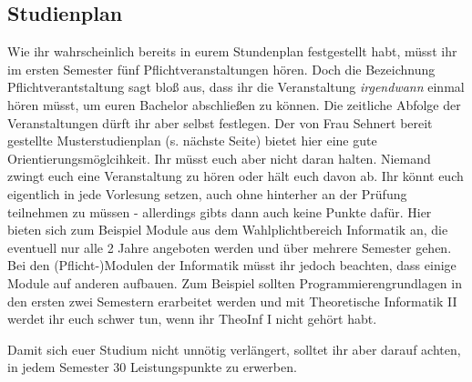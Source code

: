 \begin{multicols}{2}
\subsection{Studienplan}
	\label{bach_studienplan}
	Wie ihr wahrscheinlich bereits in eurem Stundenplan festgestellt habt, müsst ihr im ersten Semester fünf Pflichtveranstaltungen hören. Doch die Bezeichnung Pflichtverantstaltung sagt bloß aus, dass ihr die Veranstaltung \emph{irgendwann} einmal hören müsst, um euren Bachelor abschließen zu können. Die zeitliche Abfolge der Veranstaltungen dürft ihr aber selbst festlegen. Der von Frau Sehnert bereit gestellte Musterstudienplan (s. nächste Seite) bietet hier eine gute Orientierungsmöglcihkeit. Ihr müsst euch aber nicht daran halten. Niemand zwingt euch eine Veranstaltung zu hören oder hält euch davon ab. Ihr könnt euch eigentlich in jede Vorlesung setzen, auch ohne hinterher an der Prüfung teilnehmen zu müssen - allerdings gibts dann auch keine Punkte dafür. Hier bieten sich zum Beispiel Module aus dem Wahlplichtbereich Informatik an, die eventuell nur alle 2 Jahre angeboten werden und über mehrere Semester gehen. Bei den (Pflicht-)Modulen der Informatik müsst ihr jedoch beachten, dass einige Module auf anderen aufbauen. Zum Beispiel sollten Programmierengrundlagen in den ersten zwei Semestern erarbeitet werden und mit Theoretische Informatik II werdet ihr euch schwer tun, wenn ihr TheoInf I nicht gehört habt.

	Damit sich euer Studium nicht unnötig verlängert, solltet ihr aber darauf achten, in jedem Semester 30 Leistungspunkte zu erwerben. 
\end{multicols}